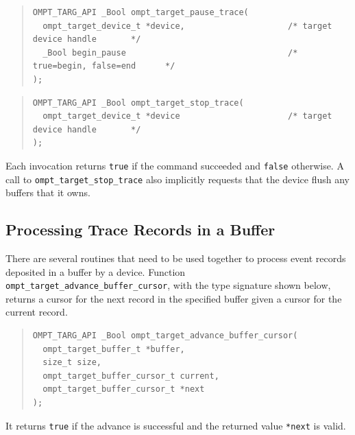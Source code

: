 \documentclass{article}
\begin{document}
\begin{quote}
\begin{verbatim}
OMPT_TARG_API _Bool ompt_target_pause_trace(
  ompt_target_device_t *device,                     /* target device handle       */
  _Bool begin_pause                                 /* true=begin, false=end      */
);
\end{verbatim}
\end{quote}

\begin{quote}
\begin{verbatim}
OMPT_TARG_API _Bool ompt_target_stop_trace(
  ompt_target_device_t *device                      /* target device handle       */
);
\end{verbatim}
\end{quote}
\noindent
Each invocation returns \verb|true| if the command succeeded and \verb|false| otherwise.
A call to \verb|ompt_target_stop_trace| also implicitly requests that the device flush any buffers that it owns.


\subsection{Processing Trace Records in a Buffer}
\label{sec:record-data}

There are several routines that need to be used together to process %
event records deposited in a buffer by a device. Function \verb|ompt_target_advance_buffer_cursor|, with the type signature shown below, returns a cursor for the next record in the specified buffer given a cursor for the current record.

\begin{quote}
\begin{verbatim}
OMPT_TARG_API _Bool ompt_target_advance_buffer_cursor(
  ompt_target_buffer_t *buffer,
  size_t size, 
  ompt_target_buffer_cursor_t current, 
  ompt_target_buffer_cursor_t *next
); 
\end{verbatim}
\end{quote}
It returns \verb|true| if the advance is successful and the returned value \verb|*next| is valid.
\end{document}
